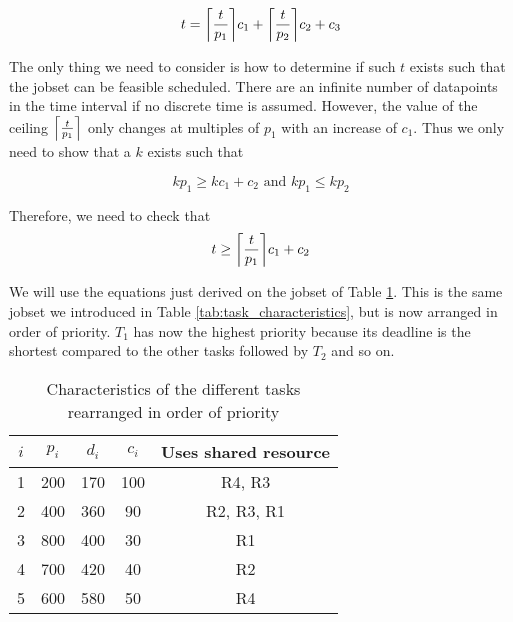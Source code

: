 \documentclass[10pt]{article}
\DeclarePairedDelimiter\ceil{\lceil}{\rceil}
\begin{document}
\begin{equation}
    t = \ceil*{\frac{t}{p_1}}c_1 + \ceil*{\frac{t}{p_2}}c_2 + c_3
\end{equation}

The only thing we need to consider is how to determine if such $t$ exists such that the jobset can be feasible scheduled.
There are an infinite number of datapoints in the time interval if no discrete time is assumed. 
However, the value of the ceiling $\ceil*{\frac{t}{p_1}}$ only changes at multiples of $p_1$ with an increase of $c_1$.
Thus we only need to show that a $k$ exists such that

\begin{equation}
    k p_1 \geq k c_1 + c_2 \text{ and } k p_1 \leq k p_2 
\end{equation}

Therefore, we need to check that
\begin{equation}
    t \geq \ceil*{\frac{t}{p_1}}c_1 + c_2
\end{equation}

We will use the equations just derived on the jobset of Table \ref{tab:task_characteristics_new}.
This is the same jobset we introduced in Table \ref{tab:task_characteristics}, but is now arranged in order of priority.
$T_1$ has now the highest priority because its deadline is the shortest compared to the other tasks followed by $T_2$ and so on.

\begin{table}[H]
    \centering
    \begin{tabular}{|c|c|c|c|c|}
        \hline 
        \textcolor{darkpink}{$i$} & \textcolor{darkpink}{\textit{$p_i$}} & \textcolor{darkpink}{\textit{$d_i$}} & \textcolor{darkpink}{\textit{$c_i$}} & \textcolor{darkpink}{Uses shared resource} \\
        \hline

        1 & 200 & 170 & 100 & R4, R3 \\
        \hline

        2 & 400 & 360 & 90 & R2, R3, R1 \\
        \hline

        3 & 800 & 400 & 30 & R1 \\
        \hline

        4 & 700 & 420 & 40 & R2 \\
        \hline

        5 & 600 & 580 & 50 & R4 \\
        \hline
        
    \end{tabular}
    
    \caption{Characteristics of the different tasks rearranged in order of priority}
    \label{tab:task_characteristics_new}
\end{table}
\end{document}
